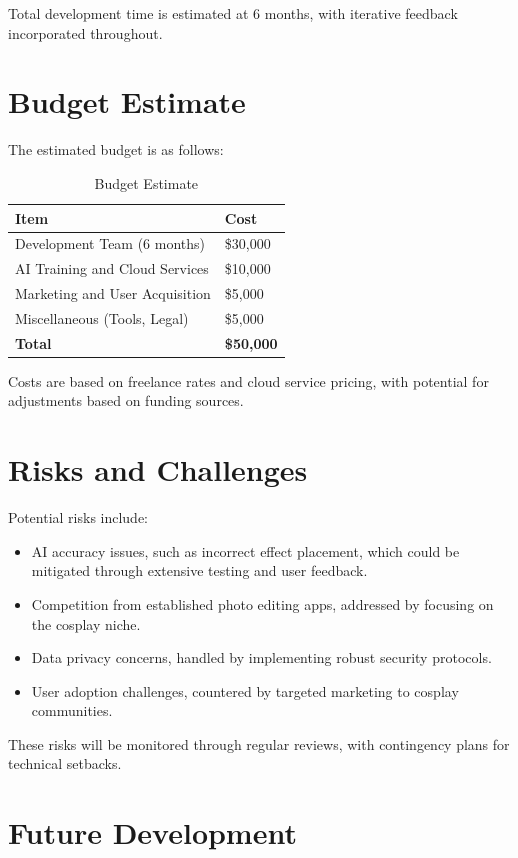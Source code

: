 \documentclass[12pt]{article}
\begin{document}
Total development time is estimated at 6 months, with iterative feedback incorporated throughout.

\section{Budget Estimate}

The estimated budget is as follows:

\begin{table}[h]
\centering
\begin{tabular}{|l|l|}
\hline
\textbf{Item} & \textbf{Cost} \\
\hline
Development Team (6 months) & \$30,000 \\
\hline
AI Training and Cloud Services & \$10,000 \\
\hline
Marketing and User Acquisition & \$5,000 \\
\hline
Miscellaneous (Tools, Legal) & \$5,000 \\
\hline
\textbf{Total} & \textbf{\$50,000} \\
\hline
\end{tabular}
\caption{Budget Estimate}
\end{table}

Costs are based on freelance rates and cloud service pricing, with potential for adjustments based on funding sources.

\section{Risks and Challenges}

Potential risks include:
\begin{itemize}
    \item AI accuracy issues, such as incorrect effect placement, which could be mitigated through extensive testing and user feedback.
    \item Competition from established photo editing apps, addressed by focusing on the cosplay niche.
    \item Data privacy concerns, handled by implementing robust security protocols.
    \item User adoption challenges, countered by targeted marketing to cosplay communities.
\end{itemize}

These risks will be monitored through regular reviews, with contingency plans for technical setbacks.

\section{Future Development}
\end{document}
